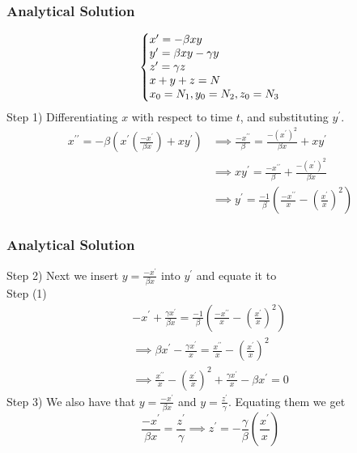 \documentclass{beamer}
\makeatletter
\newenvironment{system}%
{\left\lbrace\begin{array}{@{}l@{}}}%
{\end{array}\right.}
\makeatother
\begin{document}
\begin{frame}\frametitle{Analytical Solution}
\begin{equation*}
    \begin{system}
        x^{\prime} = -\beta x  y 
		\\
		y^{\prime} = \beta x  y - \gamma y 
		\\
		z^{\prime} = \gamma z 
		\\
		x + y + z = N
		\\
		x_0 = N_1, y_0 = N_2, z_0 = N_3
    \end{system}
\end{equation*}
Step 1) Differentiating $x$ with respect to time $t$, and substituting $y^{\prime}$.
\begin{equation*} 
	\begin{split}
		x^{\prime\prime} =
		-\beta\left( x^{\prime}\left(\frac{-x^{\prime}}{\beta x}\right) + x y^{\prime}\right)
		 & \implies \frac{-x^{\prime\prime}}{\beta} = \frac{-(x^{\prime})^{2}}{\beta x} + x y^{\prime}                             \\
		 & \implies x y^{\prime} = \frac{-x^{\prime\prime}}{\beta} + \frac{-(x^{\prime})^{2}}{\beta x}                             \\
		 & \implies y^{\prime} =  \frac{-1}{\beta}\left(\frac{-x^{\prime\prime}}{x} - \left(\frac{x^{\prime}}{x}\right)^{2}\right)
	\end{split}
\end{equation*}
\end{frame}

\begin{frame}\frametitle{Analytical Solution}
Step 2) Next we insert $y = \frac{-x^{\prime}}{\beta x}$ into $y^{\prime}$ and equate it to \\Step (1)
\begin{equation*} 
	\begin{split}
		-x^{\prime} + \frac{\gamma x^{\prime}}{\beta x} =
		\frac{-1}{\beta}\left(\frac{-x^{\prime\prime}}{x} - \left(\frac{x^{\prime}}{x}\right)^{2}\right)\\
		\implies \beta x^{\prime} - \frac{\gamma x^{\prime}}{x} = \frac{x^{\prime\prime}}{x} - \left(\frac{x^{\prime}}{x}\right)^{2}    \\
		\implies \frac{x^{\prime\prime}}{x} - \left(\frac{x^{\prime}}{x}\right)^{2} + \frac{\gamma x^{\prime}}{x} - \beta x^{\prime}= 0
	\end{split}
\end{equation*}
Step 3) We also have that $y = \frac{-x^{\prime}}{\beta x}$ and $y = \frac{z^{\prime}}{\gamma}$.
Equating them we get
\begin{equation*}
	\frac{-x^{\prime}}{\beta x} = \frac{z^{\prime}}{\gamma}
	\implies z^{\prime} = -\frac{\gamma}{\beta}\left(\frac{x^{\prime}}{x}\right)
\end{equation*}
\end{frame}
\end{document}
